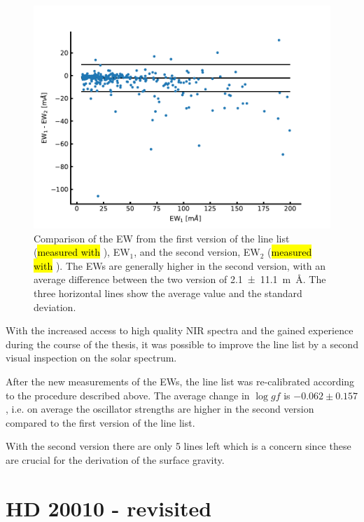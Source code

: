 \begin{figure}[htpb!]
    \centering
    \includegraphics[width=1.0\linewidth]{figures/linelist_comparison.pdf}
    \caption{Comparison of the EW from the first version of the line list (\hl{measured with}
             ), EW$_1$, and the second version, EW$_2$ (\hl{measured with} ).
             The EWs are generally higher in the second version, with an average difference between
             the two version of \SI{2.1+-11.1}{m\angstrom}. The three horizontal lines show the
             average value and the standard deviation.}
    \label{fig:linelist_comparison}
\end{figure}

With the increased access to high quality NIR spectra and the gained experience during the course
of the thesis, it was possible to improve the line list by a second visual inspection on the solar
spectrum.

After the new measurements of the EWs, the line list was re-calibrated according to the procedure
described above. The average change in $\log \mathit{gf}$ is $-0.062\pm0.157$, i.e. on average the
oscillator strengths are higher in the second version compared to the first version of the line
list.

With the second version there are only 5  lines left which is a concern since these are
crucial for the derivation of the surface gravity.




\section{HD 20010 - revisited}
\label{sec:HD20010_second}

